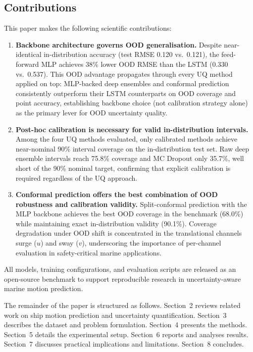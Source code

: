 \documentclass[a4paper,fleqn]{cas-sc}
\begin{document}
\subsection*{Contributions}

This paper makes the following scientific contributions:

\begin{enumerate}
    \item \textbf{Backbone architecture governs OOD generalisation.} Despite near-identical in-distribution accuracy (test RMSE 0.120 vs.\ 0.121), the feed-forward MLP achieves 38\% lower OOD RMSE than the LSTM (0.330 vs.\ 0.537). This OOD advantage propagates through every UQ method applied on top: MLP-backed deep ensembles and conformal prediction consistently outperform their LSTM counterparts on OOD coverage and point accuracy, establishing backbone choice (not calibration strategy alone) as the primary lever for OOD uncertainty quality.

    \item \textbf{Post-hoc calibration is necessary for valid in-distribution intervals.} Among the four UQ methods evaluated, only calibrated methods achieve near-nominal 90\% interval coverage on the in-distribution test set. Raw deep ensemble intervals reach 75.8\% coverage and MC Dropout only 35.7\%, well short of the 90\% nominal target, confirming that explicit calibration is required regardless of the UQ approach.

    \item \textbf{Conformal prediction offers the best combination of OOD robustness and calibration validity.} Split-conformal prediction with the MLP backbone achieves the best OOD coverage in the benchmark (68.0\%) while maintaining exact in-distribution validity (90.1\%). Coverage degradation under OOD shift is concentrated in the translational channels surge ($u$) and sway ($v$), underscoring the importance of per-channel evaluation in safety-critical marine applications.
\end{enumerate}

All models, training configurations, and evaluation scripts are released as an open-source benchmark to support reproducible research in uncertainty-aware marine motion prediction.

The remainder of the paper is structured as follows. Section~2 reviews related work on ship motion prediction and uncertainty quantification. Section~3 describes the dataset and problem formulation. Section~4 presents the methods. Section~5 details the experimental setup. Section~6 reports and analyses results. Section~7 discusses practical implications and limitations. Section~8 concludes.
\end{document}
